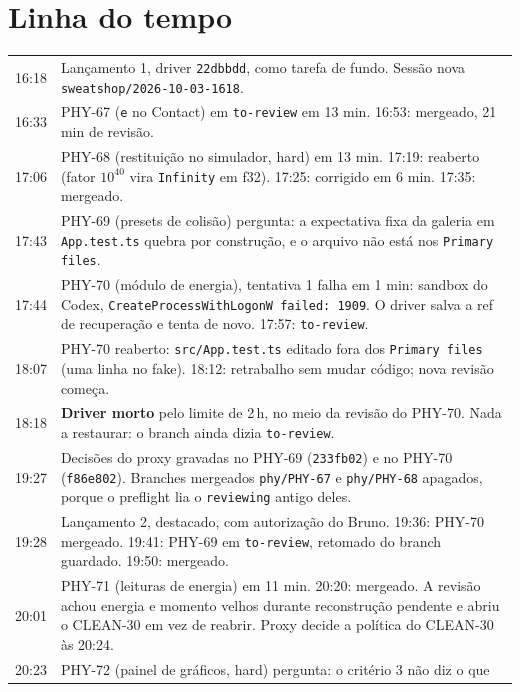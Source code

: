 \documentclass[11pt,a4paper]{article}
\begin{document}
\section{Linha do tempo}

\begin{tabularx}{\linewidth}{@{}lX@{}}
\toprule
16:18 & Lançamento 1, driver \texttt{22dbbdd}, como tarefa de fundo. Sessão nova
        \texttt{sweatshop/2026-10-03-1618}.\\
16:33 & PHY-67 (\texttt{e} no Contact) em \texttt{to-review} em 13 min. 16:53:
        mergeado, 21 min de revisão.\\
17:06 & PHY-68 (restituição no simulador, hard) em 13 min. 17:19: reaberto
        (fator $10^{40}$ vira \texttt{Infinity} em f32). 17:25: corrigido em
        6 min. 17:35: mergeado.\\
17:43 & PHY-69 (presets de colisão) pergunta: a expectativa fixa da galeria em
        \texttt{App.test.ts} quebra por construção, e o arquivo não está nos
        \texttt{Primary files}.\\
17:44 & PHY-70 (módulo de energia), tentativa 1 falha em 1 min: sandbox do
        Codex, \texttt{CreateProcessWithLogonW failed: 1909}. O driver salva a
        ref de recuperação e tenta de novo. 17:57: \texttt{to-review}.\\
18:07 & PHY-70 reaberto: \texttt{src/App.test.ts} editado fora dos
        \texttt{Primary files} (uma linha no fake). 18:12: retrabalho sem mudar
        código; nova revisão começa.\\
18:18 & \textbf{Driver morto} pelo limite de 2\,h, no meio da revisão do
        PHY-70. Nada a restaurar: o branch ainda dizia \texttt{to-review}.\\
19:27 & Decisões do proxy gravadas no PHY-69 (\texttt{233fb02}) e no PHY-70
        (\texttt{f86e802}). Branches mergeados \texttt{phy/PHY-67} e
        \texttt{phy/PHY-68} apagados, porque o preflight lia o
        \texttt{reviewing} antigo deles.\\
19:28 & Lançamento 2, destacado, com autorização do Bruno. 19:36: PHY-70
        mergeado. 19:41: PHY-69 em \texttt{to-review}, retomado do branch
        guardado. 19:50: mergeado.\\
20:01 & PHY-71 (leituras de energia) em 11 min. 20:20: mergeado. A revisão
        achou energia e momento velhos durante reconstrução pendente e abriu o
        CLEAN-30 em vez de reabrir. Proxy decide a política do CLEAN-30 às
        20:24.\\
20:23 & PHY-72 (painel de gráficos, hard) pergunta: o critério 3 não diz o que

\end{tabularx}
\end{document}
